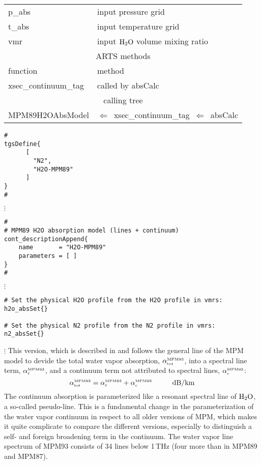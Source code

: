 {\begin{center}
\begin{tabular}{ll}
 p\_abs  & input pressure grid \\
 t\_abs  & input temperature grid\\
 vmr    & input $\mbox{H}_2\mbox{O}$ volume mixing ratio\\
\hline
\multicolumn{2}{c}{ARTS methods}\\
function           & method\\
xsec\_continuum\_tag & called by absCalc \\
\hline
\multicolumn{2}{c}{calling tree}\\
MPM89H2OAbsModel & $\Leftarrow$~xsec\_continuum\_tag~$\Leftarrow$~absCalc\\
\end{tabular}
\end{center}


\begin{verbatim}
#
tgsDefine{
      [ 
        "N2",
        "H2O-MPM89"
      ] 
}
#
\end{verbatim}
$\vdots$
\begin{verbatim}
#
# MPM89 H2O absorption model (lines + continuum)
cont_descriptionAppend{
    name       = "H2O-MPM89"
    parameters = [ ]
}
#
\end{verbatim}
$\vdots$
\begin{verbatim}
# Set the physical H2O profile from the H2O profile in vmrs:
h2o_absSet{}

# Set the physical N2 profile from the N2 profile in vmrs:
n2_absSet{}
\end{verbatim}
$\vdots$
%
%
%
% 
\label{leveld:mpm93}
This version, which is described in \cite{liebeandlayton:87} and 
follows the general line of the MPM model to devide the total 
water vapor absorption, $\alpha^{\mbox{\rm \tiny MPM93}}_{\mbox{\tiny tot}}$, into a spectral line 
term, $\alpha^{\mbox{\rm \tiny MPM93}}_{\mbox{\tiny $\ell$}}$, and a continuum term not attributed to 
spectral lines, $\alpha^{\mbox{\rm \tiny MPM93}}_{\mbox{\tiny c}}$:
\begin{equation}
  \label{eq:mpm93_abs}
  \alphampmntot = \alphampmnl + \alphampmnc\hspace*{10mm}\mbox{dB/km}
\end{equation}
The continuum absorption is parameterized like a
resonant spectral line of $\mbox{H}_2\mbox{O}$, a so-called pseudo-line. This is a 
fundamental change in the parameterization of the water vapor
continuum in respect to all older versions of MPM, which makes it 
quite complicate to compare the different versions, especially to 
distinguish a self- and foreign broadening term in the continuum.
%
%
\label{levele:h2o_mpm87_lines}
The water vapor line spectrum of MPM93 \cite{liebeetal:93} 
consists of 34 lines below 1\,THz (four more than in MPM89 and MPM87). 

}
